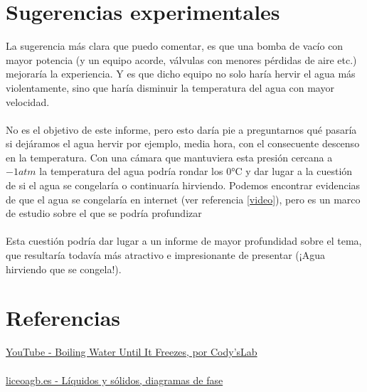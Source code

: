 \section{Sugerencias experimentales}
    La sugerencia más clara que puedo comentar, es que una bomba de vacío con mayor potencia (y un equipo acorde, válvulas con menores pérdidas de aire etc.) mejoraría la experiencia. Y es que dicho equipo no solo haría hervir el agua más violentamente, sino que haría disminuir la temperatura del agua con mayor velocidad.\\ \\No es el objetivo de este informe, pero esto daría pie a preguntarnos qué pasaría si dejáramos el agua hervir por ejemplo, media hora, con el consecuente descenso en la temperatura. Con una cámara que mantuviera esta presión cercana a $-1\textit{atm}$ la temperatura del agua podría rondar los $0\si{\celsius}$ y dar lugar a la cuestión de si el agua se congelaría o continuaría hirviendo. Podemos encontrar evidencias de que el agua se congelaría en internet (ver referencia \ref{video}), pero es un marco de estudio sobre el que se podría profundizar\\ \\Esta cuestión podría dar lugar a un informe de mayor profundidad sobre el tema, que resultaría todavía más atractivo e impresionante de presentar (¡Agua hirviendo que se congela!).
\section{Referencias}
    \hyperlink{https://www.youtube.com/watch?v=y4BGV7-1lhs&t=7s}{YouTube - Boiling Water Until It Freezes, por Cody'sLab}\label{video}\\ \\
    \hyperlink{https://www.liceoagb.es/quimigen/liqu7.html}{liceoagb.es - Líquidos y sólidos, diagramas de fase}